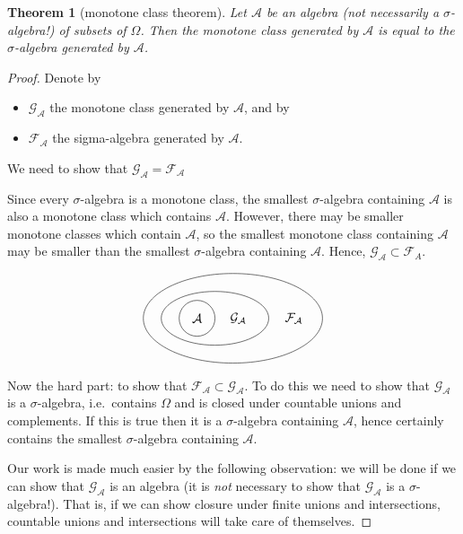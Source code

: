 \documentclass[a4paper,12pt]{scrreprt}
\theoremstyle{definition}
\theoremstyle{plain}
\newtheorem{theorem}{Theorem}[section]
\theoremstyle{remark}
\begin{document}
\begin{theorem}[monotone class theorem]
  \label{thm:monotoneclasstheorem}
  Let $\mathcal{A}$ be an algebra (not necessarily a $\sigma$-algebra!) of subsets of $\Omega$. Then the monotone class generated by $\mathcal{A}$ is equal to the $\sigma$-algebra generated by $\mathcal{A}$.
\end{theorem}
\begin{proof}
  Denote by
  \begin{itemize}
    \item $\mathcal{G}_{\mathcal{A}}$ the monotone class generated by $\mathcal{A}$, and by
    \item $\mathcal{F}_{\mathcal{A}}$ the sigma-algebra generated by $\mathcal{A}$.
  \end{itemize}
  We need to show that $\mathcal{G}_{\mathcal{A}} = \mathcal{F}_{\mathcal{A}}$

  Since every $\sigma$-algebra is a monotone class, the smallest $\sigma$-algebra containing $\mathcal{A}$ is also a monotone class which contains $\mathcal{A}$. However, there may be smaller monotone classes which contain $\mathcal{A}$, so the smallest monotone class containing $\mathcal{A}$ may be smaller than the smallest $\sigma$-algebra containing $\mathcal{A}$. Hence, $\mathcal{G}_{\mathcal{A}} \subset \mathcal{F}_{A}$.

  \begin{equation*}
    \begin{tikzpicture}
      \node at (0, 0) {$\mathcal{A}$};
      \node at (1.15, 0) {$\mathcal{G}_{\mathcal{A}}$};
      \node at (2.7, 0) {$\mathcal{F}_{\mathcal{A}}$};
      \draw (0, 0) circle [radius=0.5];
      \draw (0.5, 0) ellipse (1.5 and 0.75);
      \draw (1, 0) ellipse (2.5 and 1.25);
    \end{tikzpicture}
  \end{equation*}

  Now the hard part: to show that $\mathcal{F}_{\mathcal{A}} \subset \mathcal{G}_{\mathcal{A}}$. To do this we need to show that $\mathcal{G}_{\mathcal{A}}$ is a $\sigma$-algebra, i.e.\ contains $\Omega$ and is closed under countable unions and complements. If this is true then it is a $\sigma$-algebra containing $\mathscr{A}$, hence certainly contains the smallest $\sigma$-algebra containing $\mathscr{A}$.

  Our work is made much easier by the following observation: we will be done if we can show that $\mathcal{G}_{\mathcal{A}}$ is an algebra (it is \emph{not} necessary to show that $\mathcal{G}_{\mathcal{A}}$ is a $\sigma$-algebra!). That is, if we can show closure under finite unions and intersections, countable unions and intersections will take care of themselves.


\end{proof}
\end{document}
